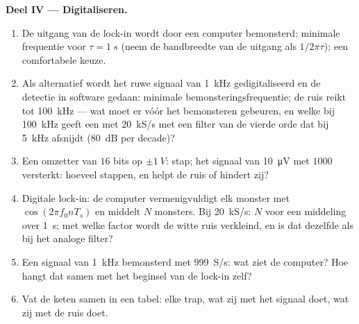 \begin{problem}
\medskip
\noindent\textbf{Deel IV --- Digitaliseren.}
\begin{enumerate}[resume]
  \item De uitgang van de lock-in wordt door een computer bemonsterd:
        minimale frequentie voor $\tau = \qty{1}{s}$ (neem de bandbreedte
        van de uitgang als $1/2\pi\tau$); een comfortabele keuze.
  \item Als alternatief wordt het ruwe signaal van \qty{1}{kHz}
        gedigitaliseerd en de detectie in software gedaan: minimale
        bemonsteringsfrequentie; de ruis reikt tot \qty{100}{kHz} --- wat
        moet er vóór het bemonsteren gebeuren, en welke  bij
        \qty{100}{kHz} geeft een  met \qty{20}{kS/s} met een
        filter van de vierde orde dat bij \qty{5}{kHz} afsnijdt
        (\qty{80}{dB} per decade)?
  \item Een omzetter van $16$ bits op $\pm\qty{1}{V}$: stap; het signaal van
        \qty{10}{\micro V} met $1000$ versterkt: hoeveel stappen, en helpt
        de ruis of hindert zij?
  \item Digitale lock-in: de computer vermenigvuldigt elk monster met
        $\cos(2\pi f_0nT_s)$ en middelt $N$ monsters. Bij \qty{20}{kS/s}:
        $N$ voor een middeling over \qty{1}{s}; met welke factor wordt de
        witte ruis verkleind, en is dat dezelfde als bij het analoge filter?
  \item Een signaal van \qty{1}{kHz} bemonsterd met \qty{999}{S/s}: wat ziet
        de computer? Hoe hangt dat samen met het beginsel van de lock-in
        zelf?
  \item Vat de keten samen in een tabel: elke trap, wat zij met het signaal
        doet, wat zij met de ruis doet.
\end{enumerate}
\end{problem}
